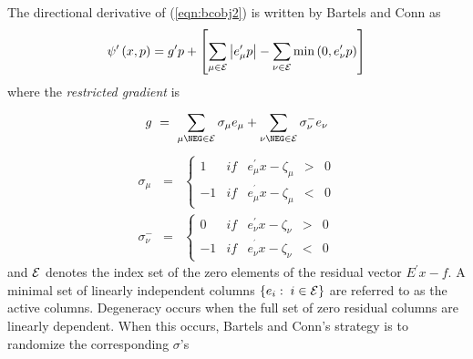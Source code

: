 The directional derivative of (\ref{eqn:bcobj2})
is written by Bartels and Conn as
\begin{equation}
\label{eqn:dd}
\psi^{\prime }\left( x, p\right)  = 
g^{\prime }p+ \left[ \sum_{\mu \in {\cal E}}\left| e_\mu
^{\prime }p\right| -\sum_{\nu \in {\cal E}}\min \left( 0,e_\nu ^{\prime
}p\right) \right] 
\end{equation}
where the {\it restricted gradient} is 
\begin{equation}
\label{eqn:gradient}g\ =\ \sum_{\mu \NEG \in {\cal E}}^{}\sigma _\mu e_\mu
+\sum_{\nu \NEG \in {\cal E}}^{}\sigma _\nu ^{-}e_\nu 
\end{equation}
\begin{equation}
\label{eqn:sigma} 
\begin{array}{lll}
\sigma _\mu & = & \left\{ 
\begin{array}{lllll}
1 & if & e_\mu ^{\prime }x-\zeta _\mu & > & 0 \\ 
-1 & if & e_\mu ^{^{\prime }}x-\zeta _\mu & < & 0 
\end{array}
\right. \\ 
\sigma _\nu ^{-} & = & \left\{ 
\begin{array}{lllll}
0 & if & e_\nu ^{\prime }x-\zeta _\nu & > & 0 \\ 
-1 & if & e_\nu ^{^{\prime }}x-\zeta _\nu & < & 0 
\end{array}
\right. 
\end{array}
\end{equation}
and $\cal E$ denotes the index set of the zero elements of the residual
vector $E^{\prime}x-f$.  A minimal set of linearly independent columns 
$\{ e_i: \; i \in \cal E \}$ are referred to as the active columns.
Degeneracy occurs when the full set of zero residual columns are
linearly dependent.  When this occurs, Bartels and Conn's strategy 
is to randomize the corresponding $\sigma$'s 
